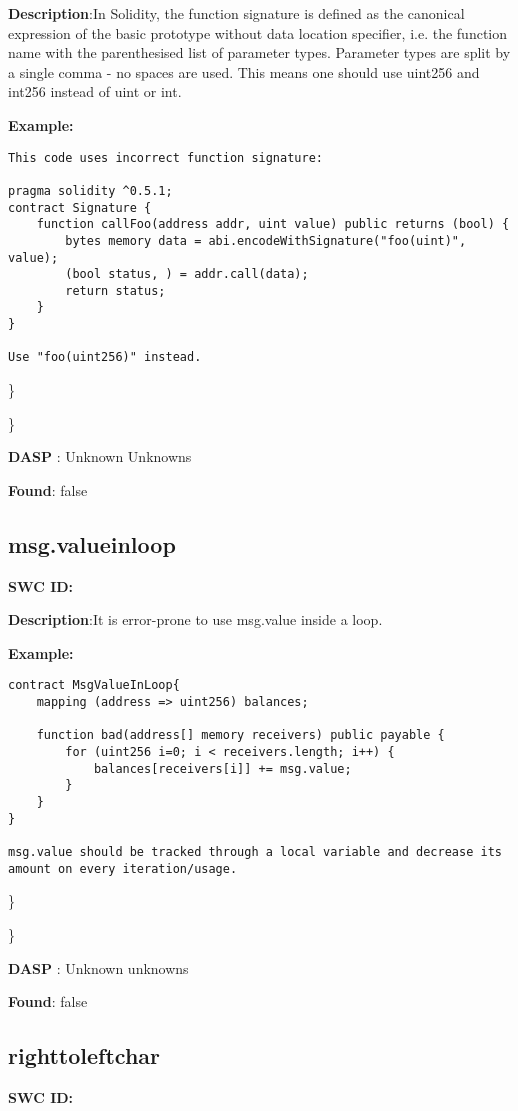 \documentclass{article}
\begin{document}
\textbf{Description}:In Solidity, the function signature is defined as the canonical expression of the basic prototype without data location specifier, i.e. the function name with the parenthesised list of parameter types. Parameter types are split by a single comma - no spaces are used. This means one should use uint256 and int256 instead of uint or int.


\textbf{Example:} 
\begin{verbatim}
This code uses incorrect function signature:

pragma solidity ^0.5.1;
contract Signature {
    function callFoo(address addr, uint value) public returns (bool) {
        bytes memory data = abi.encodeWithSignature("foo(uint)", value);
        (bool status, ) = addr.call(data);
        return status;
    }
}

Use "foo(uint256)" instead.

\end{verbatim}\} 

\} 

\textbf{DASP} : Unknown Unknowns

\textbf{Found}: false

\subsection{msg.value\textunderscore in\textunderscore loop} 
\textbf{SWC \textunderscore ID:} 

\textbf{Description}:It is error-prone to use msg.value inside a loop.


\textbf{Example:} 
\begin{verbatim}
contract MsgValueInLoop{
    mapping (address => uint256) balances;

    function bad(address[] memory receivers) public payable {
        for (uint256 i=0; i < receivers.length; i++) {
            balances[receivers[i]] += msg.value;
        }
    }
}

msg.value should be tracked through a local variable and decrease its amount on every iteration/usage.

\end{verbatim}\} 

\} 

\textbf{DASP} : Unknown unknowns

\textbf{Found}: false

\subsection{right\textunderscore to\textunderscore left\textunderscore char} 
\textbf{SWC \textunderscore ID:} 
\end{document}
